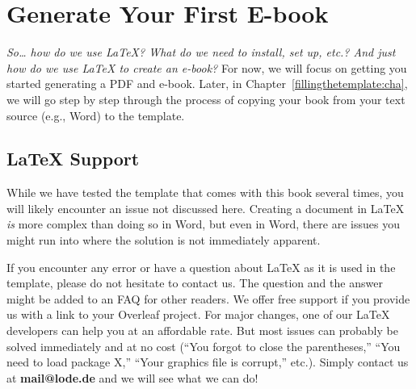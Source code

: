 


\chapter{Generate Your First E-book}\label{generateyourfirstebook:cha}

\textit{So\dots{} how do we use LaTeX? What do we need to install, set up, etc.? And just how do we use LaTeX to create an e-book?} For now, we will focus on getting you started generating a PDF and e-book. Later, in Chapter~\ref{fillingthetemplate:cha}, we will go step by step through the process of copying your book from your text source (e.g., Word) to the template.

\section{LaTeX Support}\label{latexhelp:sec}

While we have tested the template that comes with this book several times, you will likely encounter an issue not discussed here. Creating a document in LaTeX \textit{is} more complex than doing so in Word, but even in Word, there are issues you might run into where the solution is not immediately apparent. 

If you encounter any error or have a question about LaTeX as it is used in the template, please do not hesitate to contact us. The question and the answer might be added to an FAQ for other readers. We offer free support if you provide us with a link to your Overleaf project. For major changes, one of our LaTeX developers can help you at an affordable rate. But most issues can probably be solved immediately and at no cost (``You forgot to close the parentheses,'' ``You need to load package X,'' ``Your graphics file is corrupt,'' etc.). Simply contact us at \textbf{mail@lode.de} and we will see what we can do!

